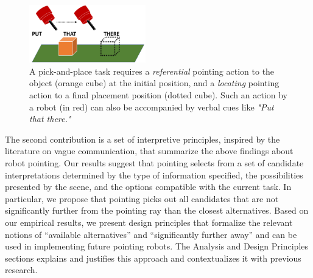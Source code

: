 \begin{figure}[t]
    \centering
    \includegraphics[width=0.45\textwidth, trim={0 0.3in 0 0in},clip]{figures/putthatthere2.png}
    \caption{A pick-and-place task requires a \textit{referential} pointing action to the object (orange cube) at the initial position, and a \textit{locating} pointing action to a final placement position (dotted cube). Such an action by a robot (in red) can also be accompanied by verbal cues like \textit{"Put that there."}}
    \label{fig:pap}
\end{figure}

The second contribution is a set of interpretive principles, inspired by the literature on vague communication, that summarize the above findings about robot pointing.  Our results suggest that pointing selects from a set of candidate interpretations determined by the type of information specified, the possibilities presented by the scene, and the options compatible with the current task.  In particular, we propose that pointing picks out all candidates that are not significantly further from the pointing ray than the closest alternatives.  Based on our empirical results, we present design principles that formalize the relevant notions of ``available alternatives'' and ``significantly further away'' and can be used in implementing future pointing robots.  The Analysis and Design Principles sections explains and justifies this approach and contextualizes it with previous research.




